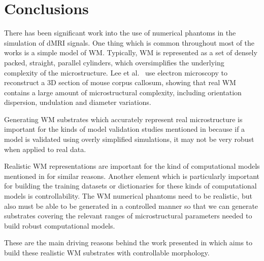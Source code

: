 \begin{comment}
This approach enables them to achieve a massive speedup in their simulation, however, it is limited by the resolution of the grid and the size of the smallest features in the mesh.
Nguyen et al.\ show that if the resolution is not sufficient, the simulated signal will not accurately represent the signal from the true mesh.
For relatively small substrates, this is not a problem as the grid can be made fine enough, however for large and complex substrates, the memory requirements may become excessive.

Currently, the \ac{GPU} \ac{dMRI} simulator presented by Nguyen et al.\ is not publicly available. 
\end{comment}

\section{Conclusions}
\label{sec:review_conclusions}
There has been significant work into the use of numerical phantoms in the simulation of \acl{dMRI} signals.
One thing which is common throughout most of the works is a simple model of \ac{WM}.
Typically, \ac{WM} is represented as a set of densely packed, straight, parallel cylinders, which oversimplifies the underlying complexity of the microstructure.
Lee et al.\ \cite{Lee2018a} use electron microscopy to reconstruct a 3D section of mouse corpus callosum, showing that real \ac{WM} contains a large amount of microstructural complexity, including orientation dispersion, undulation and diameter variations.

Generating \ac{WM} substrates which accurately represent real microstructure is important for the kinds of model validation studies mentioned in  because if a model is validated using overly simplified simulations, it may not be very robust when applied to real data.

Realistic \ac{WM} representations are important for the kind of computational models mentioned in  for similar reasons.
Another element which is particularly important for building the training datasets or dictionaries for these kinds of computational models is controllability.
The \ac{WM} numerical phantoms need to be realistic, but also must be able to be generated in a controlled manner so that we can generate substrates covering the relevant ranges of microstructural parameters needed to build robust computational models.

These are the main driving reasons behind the work presented in  which aims to build these realistic \ac{WM} substrates with controllable morphology.


